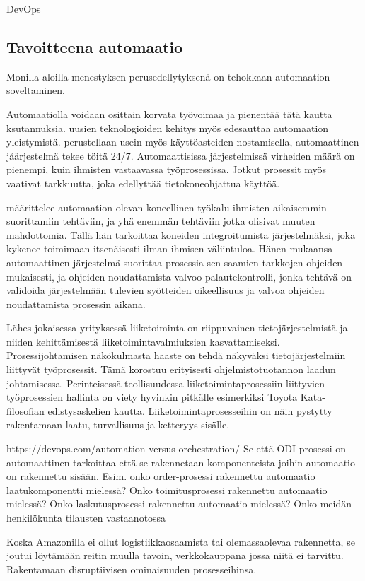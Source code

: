 \documentclass[finnish,12pt,a4paper,pdftex]{article}
\begin{document}
DevOps
\subsection{Tavoitteena automaatio}

Monilla aloilla menestyksen perusedellytyksenä on tehokkaan automaation soveltaminen. 

Automaatiolla voidaan osittain korvata työvoimaa ja pienentää tätä kautta ksutannuksia. 
uusien teknologioiden kehitys myös edesauttaa automaation yleistymistä.
perustellaan usein myös käyttöasteiden nostamisella, automaattinen jåärjestelmä tekee töitä 24/7.
Automaattisissa järjestelmissä virheiden määrä on pienempi, kuin ihmisten vastaavassa työprosessissa.
Jotkut prosessit myös vaativat tarkkuutta, joka edellyttää tietokoneohjattua käyttöä.

\cite{groover} määrittelee automaation olevan koneellinen työkalu ihmisten aikaisemmin suorittamiin tehtäviin, ja yhä enemmän tehtäviin jotka olisivat muuten mahdottomia. Tällä hän tarkoittaa koneiden integroitumista järjestelmäksi, joka kykenee toimimaan itsenäisesti ilman ihmisen väliintuloa. Hänen mukaansa automaattinen järjestelmä suorittaa prosessia sen saamien tarkkojen ohjeiden mukaisesti, ja ohjeiden noudattamista valvoo palautekontrolli, jonka tehtävä on validoida järjestelmään tulevien syötteiden oikeellisuus ja valvoa ohjeiden noudattamista prosessin aikana. 

Lähes jokaisessa yrityksessä liiketoiminta on riippuvainen tietojärjestelmistä ja niiden kehittämisestä liiketoimintavalmiuksien kasvattamiseksi. Prosessijohtamisen näkökulmasta haaste on tehdä näkyväksi tietojärjestelmiin liittyvät työprosessit. Tämä korostuu erityisesti ohjelmistotuotannon laadun johtamisessa. Perinteisessä teollisuudessa liiketoimintaprosessiin liittyvien työprosessien hallinta on viety hyvinkin pitkälle esimerkiksi Toyota Kata-filosofian edistysaskelien kautta. Liiketoimintaprosesseihin on näin pystytty rakentamaan laatu, turvallisuus ja ketteryys sisälle. 


https://devops.com/automation-versus-orchestration/ 
Se että ODI-prosessi on automaattinen tarkoittaa että se rakennetaan komponenteista joihin automaatio on rakennettu sisään. Esim. onko order-prosessi rakennettu automaatio laatukomponentti mielessä? Onko toimitusprosessi rakennettu automaatio mielessä? Onko laskutusprosessi rakennettu automaatio mielessä?
Onko meidän henkilökunta tilausten vastaanotossa 

Koska Amazonilla ei ollut logistiikkaosaamista tai olemassaolevaa rakennetta, se joutui löytämään reitin muulla tavoin, verkkokauppana jossa niitä ei tarvittu. Rakentamaan disruptiivisen ominaisuuden prosesseihinsa.
\end{document}
